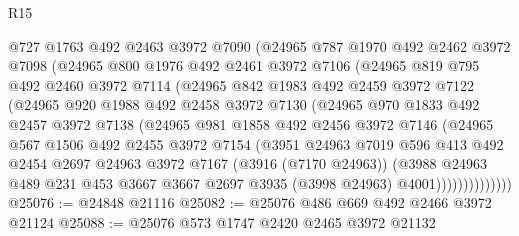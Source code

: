 \begin{lexlean}{R15}
\begin{coremodule}
            @727
            @1763
            @492
            @2463
            @3972
            @7090
            (@24965
              @787
              @1970
              @492
              @2462
              @3972
              @7098
              (@24965
                @800
                @1976
                @492
                @2461
                @3972
                @7106
                (@24965
                  @819
                  @795
                  @492
                  @2460
                  @3972
                  @7114
                  (@24965
                    @842
                    @1983
                    @492
                    @2459
                    @3972
                    @7122
                    (@24965
                      @920
                      @1988
                      @492
                      @2458
                      @3972
                      @7130
                      (@24965
                        @970
                        @1833
                        @492
                        @2457
                        @3972
                        @7138
                        (@24965
                          @981
                          @1858
                          @492
                          @2456
                          @3972
                          @7146
                          (@24965
                            @567
                            @1506
                            @492
                            @2455
                            @3972
                            @7154
                            (@3951
                              @24963
                              @7019
                              @596
                              @413
                              @492
                              @2454
                              @2697
                              @24963
                              @3972
                              @7167
                              (@3916 (@7170 @24963))
                              (@3988
                                @24963
                                @489
                                @231
                                @453
                                @3667
                                @3667
                                @2697
                                @3935
                                (@3998 @24963)
                                @4001))))))))))))))
@25076 := @24848 @21116
@25082 := @25076 @486 @669 @492 @2466 @3972 @21124
@25088 := @25076 @573 @1747 @2420 @2465 @3972 @21132

\end{coremodule}
\end{lexlean}
